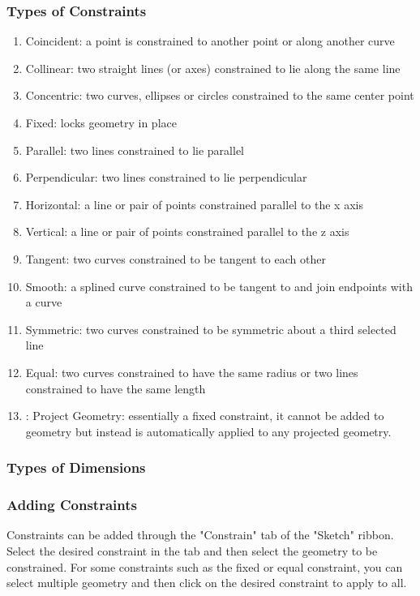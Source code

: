 \documentclass[a4paper,12pt]{report}
\begin{document}
\subsubsection{Types of Constraints}

\begin{enumerate}
\item Coincident: a point is constrained to another point or along another curve
\item Collinear: two straight lines (or axes) constrained to lie along the same line
\item Concentric: two curves, ellipses or circles constrained to the same center point
\item Fixed: locks geometry in place
\item Parallel: two lines constrained to lie parallel
\item Perpendicular: two lines constrained to lie perpendicular
\item Horizontal: a line or pair of points constrained parallel to the x axis
\item Vertical: a line or pair of points constrained parallel to the z axis
\item Tangent: two curves constrained to be tangent to each other
\item Smooth: a splined curve constrained to be tangent to and join endpoints with a curve
\item Symmetric: two curves constrained to be symmetric about a third selected line
\item Equal: two curves constrained to have the same radius or two lines constrained to have the same length
\item: Project Geometry: essentially a fixed constraint, it cannot be added to geometry but instead is automatically applied to any projected geometry.
\end{enumerate}

\subsubsection{Types of Dimensions}


\subsubsection{Adding Constraints}
Constraints can be added through the "Constrain" tab of the "Sketch" ribbon. Select the desired constraint in the tab and then select the geometry to be constrained. For some constraints such as the fixed or equal constraint, you can select multiple geometry and then click on the desired constraint to apply to all.
\end{document}
